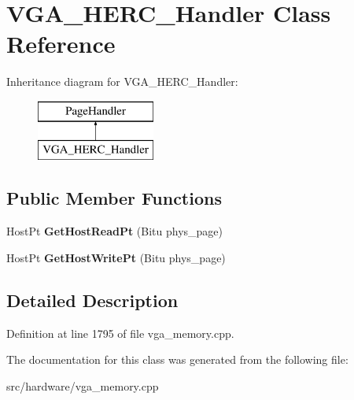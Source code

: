 \hypertarget{classVGA__HERC__Handler}{\section{V\-G\-A\-\_\-\-H\-E\-R\-C\-\_\-\-Handler Class Reference}
\label{classVGA__HERC__Handler}
}
Inheritance diagram for V\-G\-A\-\_\-\-H\-E\-R\-C\-\_\-\-Handler\-:\begin{figure}[H]
\begin{center}
\leavevmode
\includegraphics[height=2.000000cm]{classVGA__HERC__Handler}
\end{center}
\end{figure}
\subsection*{Public Member Functions}
\begin{DoxyCompactItemize}
\item 
\hypertarget{classVGA__HERC__Handler_ae520d92ecc21ac737cfc8039316e6e5c}{Host\-Pt {\bfseries Get\-Host\-Read\-Pt} (Bitu phys\-\_\-page)}\label{classVGA__HERC__Handler_ae520d92ecc21ac737cfc8039316e6e5c}

\item 
\hypertarget{classVGA__HERC__Handler_a25f8f05f6c70a3170445cf0ae346718e}{Host\-Pt {\bfseries Get\-Host\-Write\-Pt} (Bitu phys\-\_\-page)}\label{classVGA__HERC__Handler_a25f8f05f6c70a3170445cf0ae346718e}

\end{DoxyCompactItemize}


\subsection{Detailed Description}


Definition at line 1795 of file vga\-\_\-memory.\-cpp.



The documentation for this class was generated from the following file\-:\begin{DoxyCompactItemize}
\item 
src/hardware/vga\-\_\-memory.\-cpp\end{DoxyCompactItemize}
